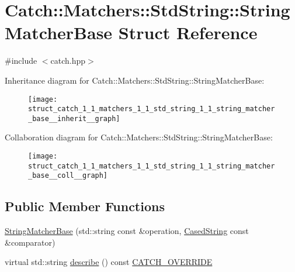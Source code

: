 \hypertarget{struct_catch_1_1_matchers_1_1_std_string_1_1_string_matcher_base}{\section{Catch\-:\-:Matchers\-:\-:Std\-String\-:\-:String\-Matcher\-Base Struct Reference}
\label{struct_catch_1_1_matchers_1_1_std_string_1_1_string_matcher_base}
}


{\ttfamily \#include $<$catch.\-hpp$>$}



Inheritance diagram for Catch\-:\-:Matchers\-:\-:Std\-String\-:\-:String\-Matcher\-Base\-:
\nopagebreak
\begin{figure}[H]
\begin{center}
\leavevmode
\texttt{[image: struct\_catch\_1\_1\_matchers\_1\_1\_std\_string\_1\_1\_string\_matcher\_base\_\_inherit\_\_graph]}
\end{center}
\end{figure}


Collaboration diagram for Catch\-:\-:Matchers\-:\-:Std\-String\-:\-:String\-Matcher\-Base\-:
\nopagebreak
\begin{figure}[H]
\begin{center}
\leavevmode
\texttt{[image: struct\_catch\_1\_1\_matchers\_1\_1\_std\_string\_1\_1\_string\_matcher\_base\_\_coll\_\_graph]}
\end{center}
\end{figure}
\subsection*{Public Member Functions}
\begin{DoxyCompactItemize}
\item 
\hyperlink{struct_catch_1_1_matchers_1_1_std_string_1_1_string_matcher_base_a3a9b66bae298ae27058478529b4bb39d}{String\-Matcher\-Base} (std\-::string const \&operation, \hyperlink{struct_catch_1_1_matchers_1_1_std_string_1_1_cased_string}{Cased\-String} const \&comparator)
\item 
virtual std\-::string \hyperlink{struct_catch_1_1_matchers_1_1_std_string_1_1_string_matcher_base_a9d15cfb882efbea778b2ed29e7f48f37}{describe} () const \hyperlink{catch_8hpp_a8ecdce4d3f57835f707915ae831eb847}{C\-A\-T\-C\-H\-\_\-\-O\-V\-E\-R\-R\-I\-D\-E}
\end{DoxyCompactItemize}
